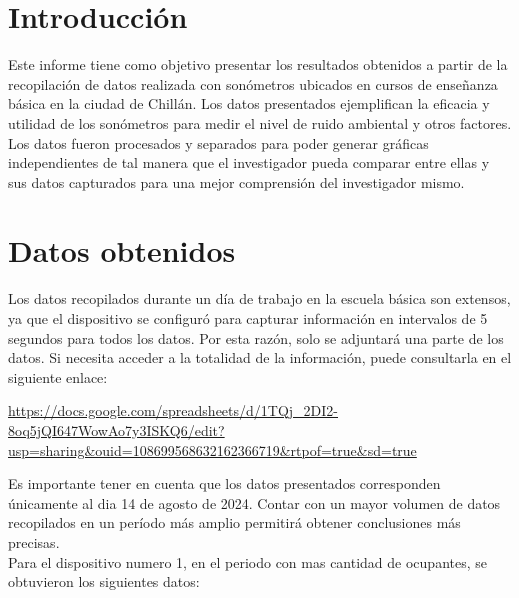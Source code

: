 \documentclass{templateNote}
\begin{document}
\asignatura{}


\portada
\margenes
\newpage 
\tableofcontents

\newpage
\section{Introducción}
Este informe tiene como objetivo presentar los resultados obtenidos a partir de la recopilación de datos realizada con sonómetros ubicados en cursos de enseñanza básica en la ciudad de Chillán. Los datos presentados ejemplifican la eficacia y utilidad de los sonómetros para medir el nivel de ruido ambiental y otros factores. Los datos fueron procesados y separados para poder generar gráficas independientes de tal manera que el investigador pueda comparar entre ellas y sus datos capturados para una mejor comprensión del investigador mismo.
\newpage
\section{Datos obtenidos}
Los datos recopilados durante un día de trabajo en la escuela básica son extensos, ya que el dispositivo se configuró para capturar información en intervalos de 5 segundos para todos los datos. Por esta razón, solo se adjuntará una parte de los datos. Si necesita acceder a la totalidad de la información, puede consultarla en el siguiente enlace: 
\begin{center}
    \url{https://docs.google.com/spreadsheets/d/1TQj_2DI2-8oq5jQI647WowAo7y3ISKQ6/edit?usp=sharing&ouid=108699568632162366719&rtpof=true&sd=true}
\end{center}

\noindent Es importante tener en cuenta que los datos presentados corresponden únicamente al dia 14 de agosto de 2024. Contar con un mayor volumen de datos recopilados en un período más amplio permitirá obtener conclusiones más precisas.
\\Para el dispositivo numero 1, en el periodo con mas cantidad de ocupantes, se obtuvieron los siguientes datos:
\end{document}
